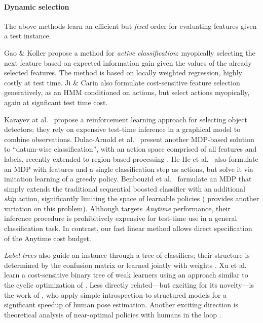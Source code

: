 \vspace{-1em}
\paragraph{Dynamic selection}%
The above methods learn an efficient but \emph{fixed} order for evaluating features given a test instance.

Gao \& Koller \cite{Gao-NIPS-2011} propose a method for \emph{active classification}: myopically selecting the next feature based on expected information gain given the values of the already selected features.
The method is based on locally weighted regression, highly costly at test time.
Ji \& Carin \cite{Ji-PR-2007} also formulate cost-sensitive feature selection generatively, as an HMM conditioned on actions, but select actions myopically, again at signficant test time cost.

Karayev at al.\ \cite{Karayev-NIPS-2012} propose a reinforcement learning approach for selecting object detectors; they rely on expensive test-time inference in a graphical model to combine observations.
Dulac-Arnold et al.\ \cite{Dulac-Arnold-ML-2012} present another MDP-based solution to ``datum-wise classification'', with an action space comprised of all features and labels, recently extended to region-based processing \cite{Dulac-Arnold-ICLR-2014}.
He He et al.\ \cite{HeHe-ICMLW-2012} also formulate an MDP with features and a single classification step as actions, but solve it via imitation learning of a greedy policy.
Benbouzid et al.\ \cite{Benbouzid-ICML-2012} formulate an MDP that simply extends the traditional sequential boosted classifier with an additional \emph{skip} action, significantly limiting the space of learnable policies (\cite{Trapeznikov} provides another variation on this problem).
Although \cite{Karayev-NIPS-2012} targets \emph{Anytime} performance, their inference procedure is prohibitively expensive for test-time use in a general classification task.
In contrast, our fast linear method allows direct specification of the Anytime cost budget.

\emph{Label trees} also guide an instance through a tree of classifiers; their structure is determined by the confusion matrix or learned jointly with weights \cite{Deng-NIPS-2011}.
Xu et al.\ \cite{Xu-ICML-2013} learn a cost-sensitive binary tree of weak learners using an approach similar to the cyclic optimization of \cite{Chen-AISTATS-2012}.
Less directly related---but exciting for its novelty---is the work of \cite{weiss2013dynamic}, who apply simple introspection to structured models for a significant speedup of human pose estimation.
Another exciting direction is theoretical analysis of near-optimal policies with humans in the loop \cite{chen14active}.
